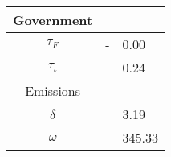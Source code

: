 \begin{table}[h!]
\begin{center}
{\begin{tabular}{c|ll}
		\hline 
		Government&\multicolumn{2}{c}{}\\
		\hline
		$\tau_F$&- &0.00\\
		$\tau_{\iota}$&\cite{Barrage2019OptimalPolicy} &0.24\\
		\hline
		Emissions&\multicolumn{2}{c}{}\\
		\hline
		$\delta$& \makecell[l]{\cite{EPAems}}&3.19\\
		$\omega$& \cite{EPAems}&345.33\\
		\hline \hline
\end{tabular}	}
\end{center}
\end{table}











